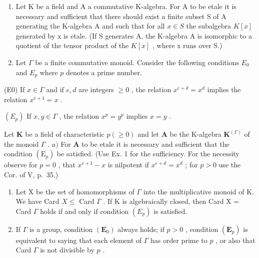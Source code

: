 \BourbakiExerciseGroup

\begin{enumerate}
\def\labelenumi{\arabic{enumi})}
\item
  Let K be a field and A a commutative K-algebra. For A to be etale it is necessary and sufficient that there should exist a finite subset S of A generating the K-algebra A and such that for all \(x \in S\) the subalgebra \(K[x]\) generated by x is etale. (If S generates A, the K-algebra A is isomorphic to a quotient of the tensor product of the \(K[x]\) , where x runs over S.)
\item
  Let \(\Gamma\) be a finite commutative monoid. Consider the following conditions \(E_0\) and \(E_p\) where \(p\) denotes a prime number.
\end{enumerate}

(E0) If \(x \in \Gamma\) and if \(e, d\) are integers \(\geqslant 0\) , the relation \(x^{e + d} = x^d\) implies the relation \(x^{e + 1} = x\) .

\((E_p)\) If \(x, y \in \Gamma\) , the relation \(x^p = y^p\) implies \(x = y\) .

Let \(\mathbf{K}\) be a field of characteristic \(p (\geqslant 0)\) and let \(\mathbf{A}\) be the K-algebra \(\mathbf{K}^{(\Gamma)}\) of the monoid \(\Gamma\) . \(a)\) For \(\mathbf{A}\) to be etale it is necessary and sufficient that the condition \((\mathrm{E}_p)\) be satisfied. (Use Ex. 1 for the sufficiency. For the necessity observe for \(p = 0\) , that \(x^{e+1} - x\) is nilpotent if \(x^{e+d} = x^d\) ; for \(p > 0\) use the Cor. of V, p.~35.)

\begin{enumerate}
\def\labelenumi{\alph{enumi})}
\setcounter{enumi}{1}
\item
  Let X be the set of homomorphisms of \(\Gamma\) into the multiplicative monoid of K. We have Card \(X \leqslant\) Card \(\Gamma\) . If K is algebraically closed, then Card X = Card \(\Gamma\) holds if and only if condition \((E_{p})\) is satisfied.
\item
  If \(\Gamma\) is a group, condition \((\mathbf{E}_0)\) always holds; if \(p > 0\) , condition \((\mathbf{E}_p)\) is equivalent to saying that each element of \(\Gamma\) has order prime to \(p\) , or also that Card \(\Gamma\) is not divisible by \(p\) .
\end{enumerate}

\BourbakiExerciseGroup

